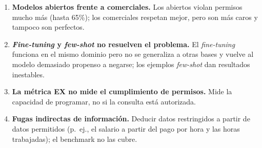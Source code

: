 \documentclass[11pt,a4paper]{article}
\begin{document}
\begin{enumerate}
  \item \textbf{Modelos abiertos frente a comerciales.} Los abiertos violan permisos mucho más (hasta 65\%); los comerciales respetan mejor, pero son más caros y tampoco son perfectos.
  \item \textbf{\textit{Fine-tuning} y \textit{few-shot} no resuelven el problema.} El \textit{fine-tuning} funciona en el mismo dominio pero no se generaliza a otras bases y vuelve al modelo demasiado propenso a negarse; los ejemplos \textit{few-shot} dan resultados inestables.
  \item \textbf{La métrica EX no mide el cumplimiento de permisos.} Mide la capacidad de programar, no si la consulta está autorizada.
  \item \textbf{Fugas indirectas de información.} Deducir datos restringidos a partir de datos permitidos (p.\ ej., el salario a partir del pago por hora y las horas trabajadas); el benchmark no las cubre.
\end{enumerate}

\end{document}
